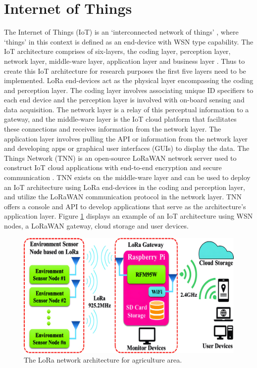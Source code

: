 \section{Internet of Things}
The Internet of Things (IoT) is an `interconnected network of things' \cite{IoT}, where `things' in this context is defined as an end-device with WSN type capability. The IoT architecture comprises of six-layers, the coding layer, perception layer, network layer, middle-ware layer, application layer and business layer \cite{IoT}. Thus to create this IoT architecture for research purposes the first five layers need to be implemented. LoRa end-devices act as the physical layer encompassing the coding and perception layer. The coding layer involves associating unique ID specifiers to each end device \cite{IoT} and the perception layer is involved with on-board sensing and data acquisition. The network layer is a relay of this perceptual information to a gateway, and the middle-ware layer is the IoT cloud platform that facilitates these connections and receives information from the network layer. The application layer involves pulling the API or information from the network layer and developing apps or graphical user interfaces (GUIs) to display the data. The Things Network (TNN) is an open-source LoRaWAN network server used to construct IoT cloud applications with end-to-end encryption and secure communication \cite{LoRaWAN-Smart-Infrastructure-Monitoring}. TNN exists on the middle-ware layer and can be used to deploy an IoT architecture using LoRa end-devices in the coding and perception layer, and utilize the LoRaWAN communication protocol in the network layer. TNN offers a console and API to develop applications that serve as the architecture's application layer. Figure \ref{LoRa-IOT-Example} displays an example of an IoT architecture using WSN nodes, a LoRaWAN gateway, cloud storage and user devices. 

\begin{figure}[h]
	\centering
	\caption{The LoRa network architecture for agriculture area. \cite{LoRaWAN-WSN-Agricultual-Application}}
	\label{LoRa-IOT-Example}
	\includegraphics[scale=0.1]{Sections/Introduction/LoRaWAN-IOT-Example.jpg}
\end{figure}